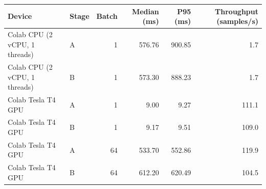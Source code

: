 \begin{tabular}{llrrrr}
\hline
Device & Stage & Batch & Median (ms) & P95 (ms) & Throughput (samples/s) \\
\hline
Colab CPU (2 vCPU, 1 threads) & A & 1 & 576.76 & 900.85 & 1.7 \\
Colab CPU (2 vCPU, 1 threads) & B & 1 & 573.30 & 888.23 & 1.7 \\
Colab Tesla T4 GPU & A & 1 & 9.00 & 9.27 & 111.1 \\
Colab Tesla T4 GPU & B & 1 & 9.17 & 9.51 & 109.0 \\
Colab Tesla T4 GPU & A & 64 & 533.70 & 552.86 & 119.9 \\
Colab Tesla T4 GPU & B & 64 & 612.20 & 620.49 & 104.5 \\
\hline
\end{tabular}
